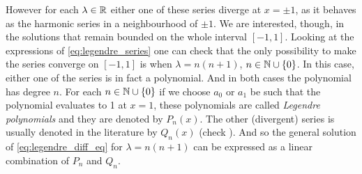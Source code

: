 \documentclass[../main.tex]{subfiles}
\begin{document}
However for each $\lambda\in\mathbb{R}$ either one of these series diverge at $x=\pm 1$, as it behaves as the harmonic series in a neighbourhood of $\pm 1$. We are interested, though, in the solutions that remain bounded on the whole interval $[-1,1]$. Looking at the expressions of \cref{eq:legendre_series} one can check that the only possibility to make the series converge on $[-1,1]$ is when $\lambda =n(n+1)$, $n\in\mathbb{N}\cup\{0\}$. In this case, either one of the series is in fact a polynomial. And in both cases the polynomial has degree $n$. For each $n\in\mathbb{N}\cup\{0\}$ if we choose $a_0$ or $a_1$ be such that the polynomial evaluates to 1 at $x=1$, these polynomials are called \emph{Legendre polynomials} and they are denoted by $P_n(x)$. The other (divergent) series is usually denoted in the literature by $Q_n(x)$ (check \cite{mathematical_methods}). And so the general solution of \cref{eq:legendre_diff_eq} for $\lambda=n(n+1)$ can be expressed as a linear combination of $P_n$ and $Q_n$.
\end{document}
